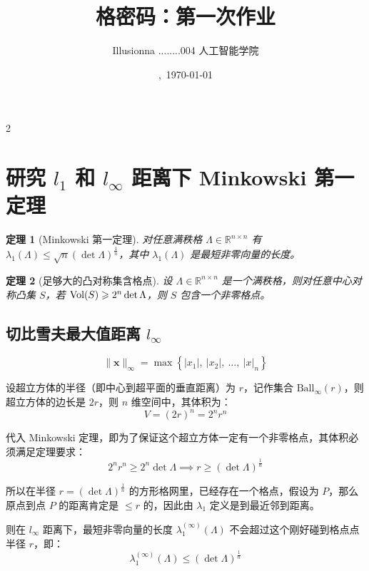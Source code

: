 \documentclass{article}
\title{格密码：第一次作业}
\author{Illusionna \quad 2025........004 \quad 人工智能学院}
\date{\currenttime,\ \today}
\newtheorem{theorem}{定理}
\begin{document}
\maketitle
\vspace*{2em}
\begin{spacing}{2}
    \tableofcontents
\end{spacing}
\thispagestyle{empty}
\clearpage
\setcounter{page}{1}



\section{研究 $l_1$ 和 $l_{\infty}$ 距离下 Minkowski 第一定理}
\begin{theorem}[Minkowski 第一定理]
    对任意满秩格 $\Lambda\in\mathbb{R}^{n\times n}$ 有 $\lambda_{1}(\Lambda)\leqslant\displaystyle\sqrt{n}(\det\Lambda)^{\tfrac{1}{n}}$，其中 $\lambda_{1}(\Lambda)$ 是最短非零向量的长度。
\end{theorem}

\begin{theorem}[足够大的凸对称集含格点]
    设 $\Lambda\in\mathbb{R}^{n\times n}$ 是一个满秩格，则对任意中心对称凸集 $S$，若 ${\rm Vol}(S)\geqslant2^{n}\det\Lambda$，则 $S$ 包含一个非零格点。
\end{theorem}



\subsection{切比雪夫最大值距离 $l_{\infty}$}
\[ \|\bm{x}\|_{\infty}=\max\left\{|x_1|,\ |x_2|,\ \ldots,\ |x|_n\right\} \]

设超立方体的半径（即中心到超平面的垂直距离）为 $r$，记作集合 $\text{Ball}_{\infty}(r)$，则超立方体的边长是 $2r$，则 $n$ 维空间中，其体积为：
\[ V=(2r)^n=2^nr^n \]

代入 Minkowski 定理，即为了保证这个超立方体一定有一个非零格点，其体积必须满足定理要求：
\[ 2^nr^n\geqslant2^n\det\Lambda\implies r\geqslant(\det\Lambda)^{\tfrac{1}{n}} \]

所以在半径 $r=(\det\Lambda)^{\tfrac{1}{n}}$ 的方形格网里，已经存在一个格点，假设为 $P$，那么原点到点 $P$ 的距离肯定是 $\leqslant r$ 的，因此由 $\lambda_1$ 定义是到最近邻到距离。

则在 $l_{\infty}$ 距离下，最短非零向量的长度 $\lambda_{1}^{(\infty)}(\Lambda)$ 不会超过这个刚好碰到格点点半径 $r$，即：
\[ \lambda_{1}^{(\infty)}(\Lambda)\leqslant(\det\Lambda)^{\tfrac{1}{n}} \]
\end{document}
